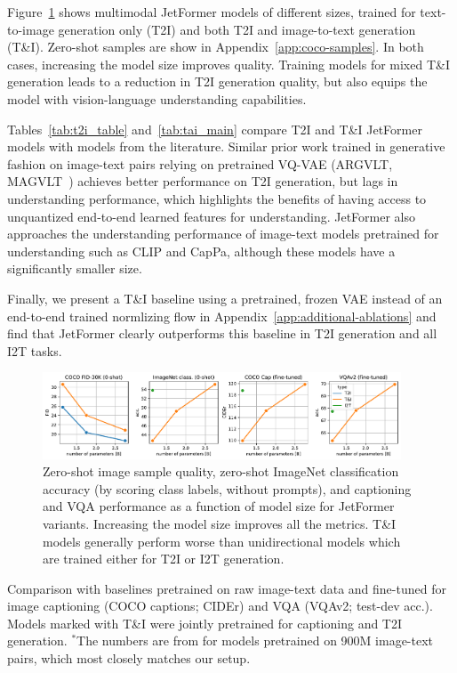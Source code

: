 \documentclass{article} %
\begin{document}
Figure~\ref{fig:tai_t2i_comparison} shows multimodal JetFormer models of different sizes, trained for text-to-image generation only (T2I) and both T2I and image-to-text generation (T\&I). Zero-shot samples are show in Appendix~\ref{app:coco-samples}.
In both cases, increasing the model size improves quality. Training models for mixed T\&I generation leads to a reduction in T2I generation quality, but also equips the model with vision-language understanding capabilities.

Tables~\ref{tab:t2i_table} and~\ref{tab:tai_main} compare T2I and T\&I JetFormer models with models from the literature. Similar prior work trained in generative fashion on image-text pairs relying on pretrained VQ-VAE (ARGVLT, MAGVLT~\citep{kim2023magvlt}) achieves better performance on T2I generation, but lags in understanding performance, which highlights the benefits of having access to unquantized end-to-end learned features for understanding. JetFormer also approaches the understanding performance of image-text models pretrained for understanding such as CLIP and CapPa, although these models have a significantly smaller size.

Finally, we present a T\&I baseline using a pretrained, frozen VAE instead of an end-to-end trained normlizing flow in Appendix~\ref{app:additional-ablations} and find that JetFormer clearly outperforms this baseline in T2I generation and all I2T tasks.

\begin{figure}
    \centering
    \includegraphics[width=0.95\textwidth]{figures/params_vs_quality_mm}
    \caption{Zero-shot image sample quality, zero-shot ImageNet classification accuracy (by scoring class labels, without prompts), and captioning and VQA performance as a function of model size for JetFormer variants. Increasing the model size improves all the metrics. T\&I models generally perform worse than unidirectional models which are trained either for T2I or I2T generation.
    }
    \label{fig:tai_t2i_comparison}
\end{figure}



\begin{table}[th]
    \caption{Comparison with baselines pretrained on raw image-text data and fine-tuned for image captioning (COCO captions; CIDEr) and VQA (VQAv2; test-dev acc.). Models marked with T\&I were jointly pretrained for captioning and T2I generation. $^*$The numbers are from \citep{tschannen2023image} for models pretrained on 900M image-text pairs, which most closely matches our setup.}
    \centering
    
\label{tab:tai_main}
\end{table}
\end{document}
